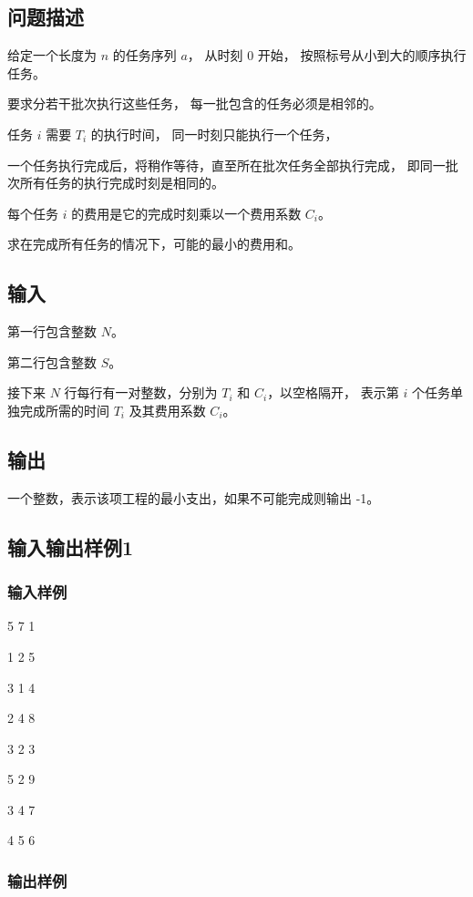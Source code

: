 \documentclass[UTF8]{ctexart}
\begin{document}
\subsection{问题描述}

给定一个长度为 $n$ 的任务序列 $a$， 从时刻 $0$ 开始， 按照标号从小到大的顺序执行任务。

要求分若干批次执行这些任务， 每一批包含的任务必须是相邻的。

任务 $i$ 需要 $T_i$ 的执行时间， 同一时刻只能执行一个任务，

一个任务执行完成后，将稍作等待，直至所在批次任务全部执行完成， 即同一批次所有任务的执行完成时刻是相同的。

每个任务 $i$ 的费用是它的完成时刻乘以一个费用系数 $C_i$。

求在完成所有任务的情况下，可能的最小的费用和。

\subsection{输入} 

第一行包含整数 $N$。

第二行包含整数 $S$。

接下来 $N$ 行每行有一对整数，分别为 $T_i$ 和 $C_i$，以空格隔开， 表示第 $i$ 个任务单独完成所需的时间 $T_i$ 及其费用系数 $C_i$。

\subsection{输出}

一个整数，表示该项工程的最小支出，如果不可能完成则输出 -1。

\subsection{输入输出样例1}
\subsubsection{输入样例}

5 7 1

1 2 5

3 1 4

2 4 8

3 2 3

5 2 9

3 4 7

4 5 6

\subsubsection{输出样例}
\end{document}
